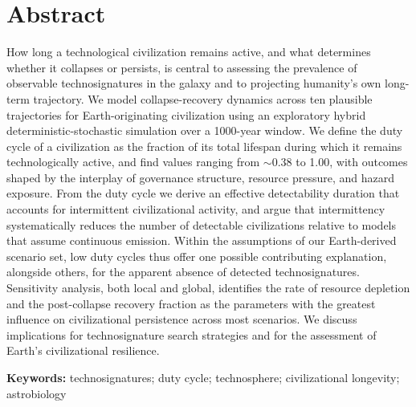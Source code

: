 \section*{Abstract}

How long a technological civilization remains active, and what determines whether it collapses or persists, is central to assessing the prevalence of observable technosignatures in the galaxy and to projecting humanity's own long-term trajectory. We model collapse-recovery dynamics across ten plausible trajectories for Earth-originating civilization using an exploratory hybrid deterministic-stochastic simulation over a 1000-year window. We define the duty cycle of a civilization as the fraction of its total lifespan during which it remains technologically active, and find values ranging from $\sim$0.38 to 1.00, with outcomes shaped by the interplay of governance structure, resource pressure, and hazard exposure. From the duty cycle we derive an effective detectability duration that accounts for intermittent civilizational activity, and argue that intermittency systematically reduces the number of detectable civilizations relative to models that assume continuous emission. Within the assumptions of our Earth-derived scenario set, low duty cycles thus offer one possible contributing explanation, alongside others, for the apparent absence of detected technosignatures. Sensitivity analysis, both local and global, identifies the rate of resource depletion and the post-collapse recovery fraction as the parameters with the greatest influence on civilizational persistence across most scenarios. We discuss implications for technosignature search strategies and for the assessment of Earth's civilizational resilience.

\vspace{1em}
\noindent\textbf{Keywords:} technosignatures; duty cycle; technosphere; civilizational longevity; astrobiology
